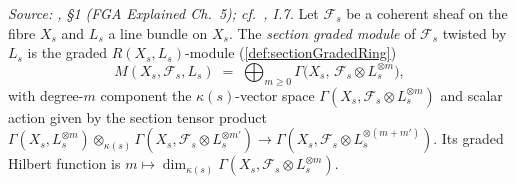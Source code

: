 \begin{definition}
  \label{def:sectionGradedModule}
  \textit{Source: \cite{nitsure-hilbert-quot}, \S 1 (FGA Explained Ch.~5); cf.\ \cite{hartshorne-ag},
  I.7.}
  Let \(\mathcal{F}_s\) be a coherent sheaf on the fibre \(X_s\) and \(L_s\) a
  line bundle on \(X_s\). The \emph{section graded module} of \(\mathcal{F}_s\)
  twisted by \(L_s\) is the graded \(R(X_s, L_s)\)-module
  (\cref{def:sectionGradedRing})
  \[
    M(X_s, \mathcal{F}_s, L_s)
    \;=\; \bigoplus_{m \ge 0} \Gamma\bigl(X_s,\, \mathcal{F}_s \otimes L_s^{\otimes m}\bigr),
  \]
  with degree-\(m\) component the \(\kappa(s)\)-vector space
  \(\Gamma(X_s, \mathcal{F}_s \otimes L_s^{\otimes m})\) and scalar action given
  by the section tensor product
  \(\Gamma(X_s, L_s^{\otimes m}) \otimes_{\kappa(s)}
  \Gamma(X_s, \mathcal{F}_s \otimes L_s^{\otimes m'})
  \to \Gamma(X_s, \mathcal{F}_s \otimes L_s^{\otimes (m+m')})\). Its graded Hilbert
  function is \(m \mapsto \dim_{\kappa(s)}
  \Gamma(X_s, \mathcal{F}_s \otimes L_s^{\otimes m})\).
\end{definition}

